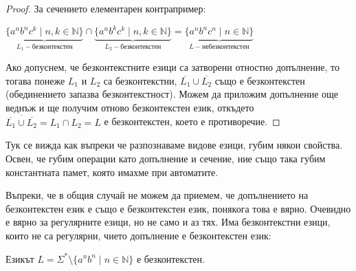 \begin{proof}
    За сечението елементарен контрапример:

    \begin{center}
        $\underbrace{\{ a^nb^nc^k \mid n, k \in \mathbb{N} \}}_{L_1 - \text{безконтекстен}} \cap \underbrace{\{ a^nb^kc^k \mid n, k \in \mathbb{N} \}}_{L_2 - \text{безконтекстен}} = \underbrace{\{ a^nb^nc^n \mid n \in \mathbb{N} \}}_{L - \text{небезконтекстен}}$
    \end{center}

    Ако допуснем, че безконтекстните езици са затворени отностно допълнение, то тогава понеже $L_1$ и $L_2$ са безконтекстни, $\overline{L_1} \cup \overline{L_2}$ също е безконтекстен (обединението запазва безконтекстност).
    Можем да приложим допълнение още веднъж и ще получим отново безконтекстен език, откъдето $\overline{\overline{L_1} \cup \overline{L_2}} = L_1 \cap L_2 = L$ е безконтекстен, което е противоречие.
\end{proof}

Тук се вижда как въпреки че разпознаваме видове езици, губим някои свойства.
Освен, че губим операции като допълнение и сечение, ние също така губим константната памет, която имахме при автоматите.

\begin{warning}
    Въпреки, че в общия случай не можем да приемем, че допълнението на безконтекстен език е също е безконтекстен език, понякога това е вярно.
    Очевидно е вярно за регулярните езици, но не само и аз тях.
    Има безконтекстни езици, които не са регулярни, чието допълнение е безконтекстен език:
\end{warning}

\begin{claim}
    Езикът $L =\Sigma^* \setminus \{ a^nb^n \mid n \in \mathbb{N} \}$ е безконтекстен.
\end{claim}

